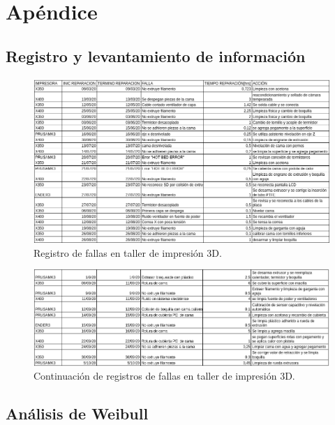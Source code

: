 
\chapter{Apéndice}
\label{cap:manual}


\section{Registro y levantamiento de información}

\begin{figure}[H]
\centering
\includegraphics[scale=0.6]{images/registrofallas1.png}
\caption{Registro de fallas en taller de impresión 3D.}
\label{registrofallas1}
\end{figure}

\begin{figure}[H]
\centering
\includegraphics[scale=0.6]{images/registrofallas2.png}
\caption{Continuación de registros de fallas en taller de impresión 3D.}
\label{registrofallas2}
\end{figure}



\section{Análisis de Weibull}


